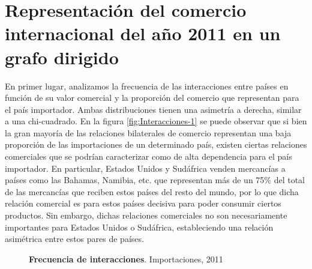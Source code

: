 \documentclass[a4paper]{article}
\begin{document}
\section{Representación del comercio internacional del año 2011 en un grafo dirigido}

En primer lugar, analizamos la frecuencia de las interacciones entre países en función de su valor comercial y la proporción del comercio que representan para el país importador. Ambas distribuciones tienen una asimetría a derecha, similar a una chi-cuadrado. En la figura \ref{fig:Interacciones-1} se puede observar que si bien la gran mayoría de las relaciones bilaterales de comercio representan una baja proporción de las importaciones de un determinado país, existen ciertas relaciones comerciales que se podrían caracterizar como de alta dependencia para el país importador. En particular, Estados Unidos y Sudáfrica venden mercancías a países como las Bahamas, Namibia, etc. que representan más de un 75\% del total de las mercancías que reciben estos países del resto del mundo, por lo que dicha relación comercial es para estos países decisiva para poder consumir ciertos productos. Sin embargo, dichas relaciones comerciales no son necesariamente importantes para Estados Unidos o Sudáfrica, estableciendo una relación asimétrica entre estos pares de países.


\begin{figure}
\centering
{}
\caption{\textbf{Frecuencia de interacciones}. Importaciones, 2011}
\label{fig:Interacciones}
\end{figure}
\end{document}
